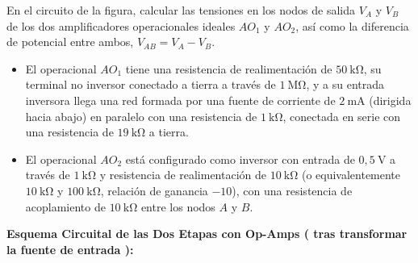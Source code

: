 \begin{ejercicio}
En el circuito de la figura, calcular las tensiones en los nodos de salida $V_A$ y $V_B$ de los dos amplificadores operacionales ideales $AO_1$ y $AO_2$, así como la diferencia de potencial entre ambos, $V_{AB} = V_A - V_B$.
\begin{itemize}[leftmargin=*]
    \item El operacional $AO_1$ tiene una resistencia de realimentación de $50\ \si{\kilo\ohm}$, su terminal no inversor conectado a tierra a través de $1\ \si{\mega\ohm}$, y a su entrada inversora llega una red formada por una fuente de corriente de $2\ \si{\milli\ampere}$ (dirigida hacia abajo) en paralelo con una resistencia de $1\ \si{\kilo\ohm}$, conectada en serie con una resistencia de $19\ \si{\kilo\ohm}$ a tierra.
    \item El operacional $AO_2$ está configurado como inversor con entrada de $0{,}5\ \si{\volt}$ a través de $1\ \si{\kilo\ohm}$ y resistencia de realimentación de $10\ \si{\kilo\ohm}$ (o equivalentemente $10\ \si{\kilo\ohm}$ y $100\ \si{\kilo\ohm}$, relación de ganancia $-10$), con una resistencia de acoplamiento de $10\ \si{\kilo\ohm}$ entre los nodos $A$ y $B$.
\end{itemize}
\tcbline
\textbf{Esquema Circuital de las Dos Etapas con Op-Amps ( tras transformar la fuente de entrada ):}\\[4pt]
\begin{center}
\end{center}
\end{ejercicio}
